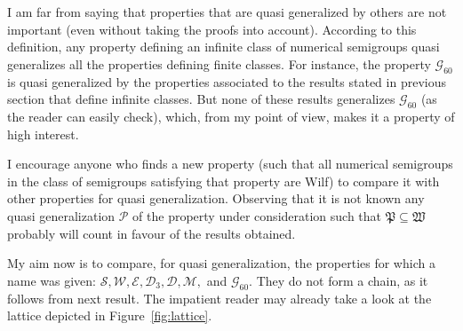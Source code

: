 I am far from saying that properties that are quasi generalized by others are not important (even without taking the proofs into account). According to this definition, any property defining an infinite class of numerical semigroups quasi generalizes all the properties defining finite classes. For instance, the property $\mathcal{G}_{60}$ is quasi generalized by the properties associated to the results stated in previous section that define infinite classes. But none of these results generalizes $\mathcal{G}_{60}$ (as the reader can easily check), which, from my point of view, makes it a property of high interest.

I encourage anyone who finds a new property (such that all numerical semigroups in the class of semigroups satisfying that property are Wilf) to compare it with other properties for quasi generalization. Observing that it is not known any quasi generalization $\mathcal{P}$ of the property under consideration such that $\mathfrak{P}\subseteq\mathfrak{W}$ probably will count in favour of the results obtained.

 My aim now is to compare, for quasi generalization, the properties for which a name was given: $\mathcal{S},\mathcal{W}, \mathcal{E},\mathcal{D}_3,\mathcal{D},\mathcal{M},$ and $\mathcal{G}_{60}$. 
They do not form a chain, as it follows from next result. The impatient reader may already take a look at the lattice depicted in Figure~\ref{fig:lattice}.

